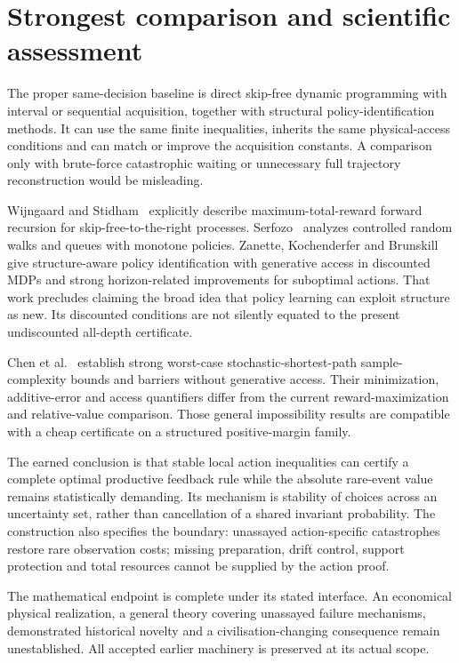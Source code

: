 \documentclass[10pt,a4paper]{article}
\begin{document}
\section{Strongest comparison and scientific assessment}

The proper same-decision baseline is direct skip-free dynamic programming with interval or sequential acquisition, together with structural policy-identification methods. It can use the same finite inequalities, inherits the same physical-access conditions and can match or improve the acquisition constants. A comparison only with brute-force catastrophic waiting or unnecessary full trajectory reconstruction would be misleading.

Wijngaard and Stidham~\cite{wijngaard} explicitly describe maximum-total-reward forward recursion for skip-free-to-the-right processes. Serfozo~\cite{serfozo} analyzes controlled random walks and queues with monotone policies. Zanette, Kochenderfer and Brunskill~\cite{zanette} give structure-aware policy identification with generative access in discounted MDPs and strong horizon-related improvements for suboptimal actions. That work precludes claiming the broad idea that policy learning can exploit structure as new. Its discounted conditions are not silently equated to the present undiscounted all-depth certificate.

Chen et al.~\cite{chen} establish strong worst-case stochastic-shortest-path sample-complexity bounds and barriers without generative access. Their minimization, additive-error and access quantifiers differ from the current reward-maximization and relative-value comparison. Those general impossibility results are compatible with a cheap certificate on a structured positive-margin family.

The earned conclusion is that stable local action inequalities can certify a complete optimal productive feedback rule while the absolute rare-event value remains statistically demanding. Its mechanism is stability of choices across an uncertainty set, rather than cancellation of a shared invariant probability. The construction also specifies the boundary: unassayed action-specific catastrophes restore rare observation costs; missing preparation, drift control, support protection and total resources cannot be supplied by the action proof.

The mathematical endpoint is complete under its stated interface. An economical physical realization, a general theory covering unassayed failure mechanisms, demonstrated historical novelty and a civilisation-changing consequence remain unestablished. All accepted earlier machinery is preserved at its actual scope.
\end{document}
